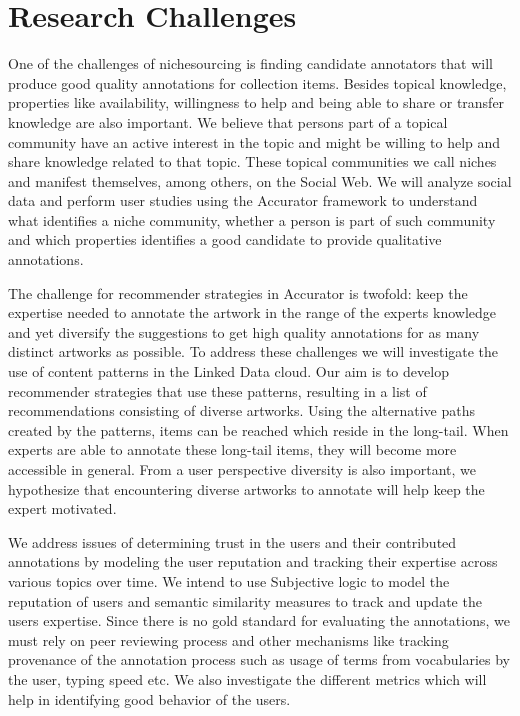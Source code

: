 \section{Research Challenges}\label{use_case}

One of the challenges of nichesourcing is finding candidate annotators that will produce good quality annotations for collection items. Besides topical knowledge, properties like availability, willingness to help and being able to share or transfer knowledge are also important. We believe that persons part of a topical community have an active interest in the topic and might be willing to help and share knowledge related to that topic. These topical communities we call niches and manifest themselves, among others, on the Social Web. We will analyze social data and perform user studies using the Accurator framework to understand what identifies a niche community, whether a person is part of such community and which properties identifies a good candidate to provide qualitative annotations. 

The challenge for recommender strategies in Accurator is twofold: keep the expertise needed to annotate the artwork in the range of the experts knowledge and yet diversify the suggestions to get high quality annotations for as many distinct artworks as possible. To address these challenges we will investigate the use of content patterns in the Linked Data cloud. Our aim is to develop recommender strategies that use these patterns, resulting in a list of recommendations consisting of diverse artworks. Using the alternative paths created by the patterns, items can be reached which reside in the long-tail. When experts are able to annotate these long-tail items, they will become more accessible in general. From a user perspective diversity is also important, we hypothesize that encountering diverse artworks to annotate will help keep the expert motivated.

We address issues of determining trust in the users and their contributed annotations by modeling the user reputation and tracking their expertise across various topics over time. We intend to use Subjective logic to model the reputation of users and semantic similarity measures to track and update the users expertise. Since there is no gold standard for evaluating the annotations, we must rely on peer reviewing process and other mechanisms like tracking provenance of the annotation process such as usage of terms from vocabularies by the user, typing speed etc. We also investigate the different metrics which will help in identifying good behavior of the users. 

